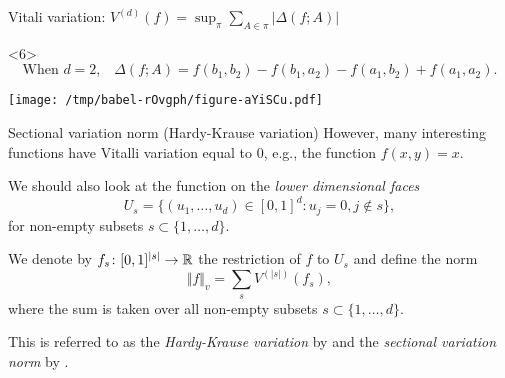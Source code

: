 \documentclass[smaller]{beamer}\usepackage{listings}
\begin{document}
\begin{frame}[label={sec:orgedc8ebc}]{Vitali variation: \normalsize \(V^{(d)}(f) = \sup_{\pi} \sum_{A \in \pi} | \Delta(f;A)|\)}
\begin{onlyenv}<6>
\small
\color{black}
\begin{equation*}
  \text{When \(d=2\),} \quad 
  \Delta(f;A) = f(b_1, b_2) - f(b_1, a_2) - f(a_1, b_2) + f(a_1, a_2).
\end{equation*}
\color{black}

\vfill

\begin{center}
\texttt{[image: /tmp/babel-rOvgph/figure-aYiSCu.pdf]}
\end{center}
\end{onlyenv}
\end{frame}


\begin{frame}[label={sec:orgee71dd0}]{Sectional variation norm (Hardy-Krause variation)}
However, many interesting functions have Vitalli variation equal to 0, e.g., the
function $f(x,y) = x$.

\vfill \pause We should also look at the function on the \textit{lower dimensional faces}
\begin{equation*}
  U_s = \{(u_1, \dots, u_d) \in [0,1]^d : u_j = 0, j \not\in s \},
\end{equation*}
for non-empty subsets \(s \subset \{1, \dots, d\}\).

\vfill \pause
We denote by \(f_s \colon [0,1]^{|s|} \rightarrow \mathbb{R}\) the restriction of \(f\)
to \(U_s\) and define the norm
\begin{equation*}
  \Vert f \Vert_{v} = \sum_{s} V^{(|s|)}(f_s),
\end{equation*}
where the sum is taken over all non-empty subsets \(s \subset \{1, \dots, d\}\).

\vfill

This is referred to as the \emph{Hardy-Krause variation} by
\cite{fang2021multivariate} and the \emph{sectional variation norm} by
\cite{van2017generally}.
\end{frame}
\end{document}
